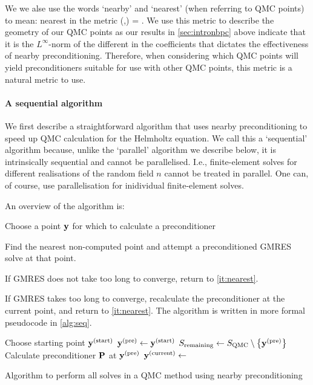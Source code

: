 We we alse use the words `nearby' and `nearest' (when referring to QMC points) to mean: nearest in the metric
\beqs
\dQMC(\byo,\byt) = .
\eeqs
We use this metric to describe the geometry of our QMC points as our results in \cref{sec:intronbpc} above indicate that it is the $L^\infty$-norm of the different in the coefficients that dictates the effectiveness of nearby preconditioning. Therefore, when considering which QMC points will yield preconditioners suitable for use with other QMC points, this metric is a natural metric to use.


\paragraph{A sequential algorithm} We first describe a straightforward algorithm that uses nearby preconditioning to speed up QMC calculation for the Helmholtz equation. We call this a `sequential' algorithm because, unlike the `parallel' algorithm we describe below, it is intrinsically sequential and cannot be parallelised. I.e., finite-element solves for different realisations of the random field $n$ cannot be treated in parallel. One can, of course, use parallelisation for inidividual finite-element solves.

An overview of the algorithm is:
\ben
\item Choose a point $\mathbf{y}$ for which to calculate a preconditioner
\item\label{it:nearest} Find the nearest non-computed point and attempt a preconditioned GMRES solve at that point.
    \item If GMRES does not take too long to converge, return to \cref{it:nearest}.
\item If GMRES takes too long to converge, recalculate the preconditioner at the current point, and return to \cref{it:nearest}.
  \een
  The algorithm is written in more formal pseudocode in \cref{alg:seq}.
\begin{algorithm}[h]
\DontPrintSemicolon
{}

\Input{$\maxGMRES$,$\SQMC$}
\BlankLine
Choose starting point $\mathbf{y}^{(\mathrm{start})}$\;
$\mathbf{y}^{(\mathrm{pre})} \leftarrow \mathbf{y}^{(\mathrm{start})}$\;
$\Sremaining \defined \SQMC\setminus\set{\bypre}$\;
Calculate preconditioner $\mathbf{P}$ at $\mathbf{y}^{(\mathrm{pre})}$\;
$\mathbf{y}^{(\mathrm{current})} \leftarrow$ \Nearest{$\bypre,\Sremaining$}\;
\caption{Algorithm to perform all solves in a QMC method using nearby preconditioning\label{alg:seq}}
\end{algorithm}
